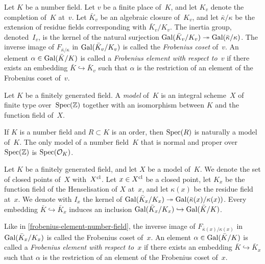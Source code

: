 \documentclass[10pt,twoside,leqno]{article}
\numberwithin{equation}{subsection}
\newcommand{\into}{\hookrightarrow}
\newcommand{\onto}{\twoheadrightarrow}
\newcommand{\ZZ}{\mathbb{Z}}
\newcommand{\Spec}{\textnormal{Spec}}
\newcommand{\Gal}{\textnormal{Gal}}
\newcommand{\cl}{\textnormal{cl}}
\begin{document}
\begin{definition} %
 \label{frobenius-element-number-field}
 Let $K$ be a number field.
 Let $v$ be a finite place of~$K$,
 and let $K_v$ denote the completion of~$K$ at~$v$.
 Let $\bar{K}_v$ be an algebraic closure of~$K_v$, and
 let $\bar{\kappa}/\kappa$ be the extension of residue fields
 corresponding with $\bar{K}_v/K_v$.
 The inertia group, denoted~$I_v$,
 is the kernel of the natural surjection
 $\Gal(\bar{K}_v/K_v) \onto \Gal(\bar{\kappa}/\kappa)$.
 The inverse image of $F_{\bar{\kappa}/\kappa}$
 in $\Gal(\bar{K}_v/K_v)$
 is called the \emph{Frobenius coset} of~$v$.
 An element $\alpha \in \Gal(\bar{K}/K)$ is called a
 \emph{Frobenius element with respect to~$v$}
 if there exists an embedding $\bar{K} \into \bar{K}_v$
 such that $\alpha$ is the restriction
 of an element of the Frobenius coset of~$v$.
\end{definition}

\begin{definition} %
 \label{field-model}
 Let $K$ be a finitely generated field.
 A \emph{model} of~$K$ is an
 integral scheme~$X$ of finite type over~$\Spec(\ZZ)$
 together with an isomorphism between $K$ and the function field of~$X$.
\end{definition}

\begin{remark} %
 \label{model-remark}
 If $K$ is a number field
 and $R \subset K$ is an order,
 then $\Spec(R)$ is naturally a model of~$K$.
 The only model of a number field~$K$ that is normal
 and proper over~$\Spec(\ZZ)$ is $\Spec(\mathcal{O}_{K})$.
\end{remark}

\begin{definition} %
 \label{frobenius-element-model}
 Let $K$ be a finitely generated field,
 and let $X$ be a model of~$K$.
 We denote the set of closed points of~$X$ with~$X^\cl$.
 Let $x \in X^\cl$ be a closed point,
 let $K_x$ be the function field of the Henselisation of $X$ at~$x$,
 and let $\kappa(x)$ be the residue field at~$x$.
 We denote with $I_x$ the kernel of
 $\Gal(\bar{K}_x/K_x) \onto \Gal(\bar{\kappa}(x)/\kappa(x))$.
 Every embedding $\bar{K} \into \bar{K}_x$
 induces an inclusion $\Gal(\bar{K}_x/K_x) \into \Gal(\bar{K}/K)$.
 
 Like in \cref{frobenius-element-number-field},
 the inverse image of $F_{\bar{\kappa}(x)/\kappa(x)}$
 in $\Gal(\bar{K}_x/K_x)$
 is called the Frobenius coset of~$x$.
 An element $\alpha \in \Gal(\bar{K}/K)$ is called a
 \emph{Frobenius element with respect to~$x$}
 if there exists an embedding $\bar{K} \into \bar{K}_x$
 such that $\alpha$ is the restriction
 of an element of the Frobenius coset of~$x$.
\end{definition}
\end{document}
